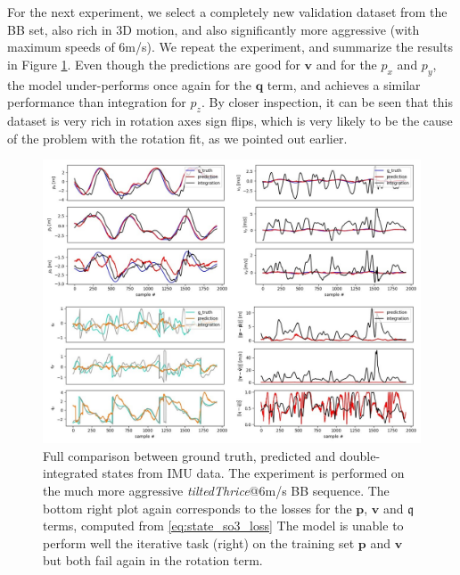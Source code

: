 For the next experiment, we select a completely new validation dataset from the BB set, also rich in 3D motion, and also significantly more aggressive (with maximum speeds of 6m/s). 
We repeat the experiment, and summarize the results in Figure \ref{fig:so3_tiltedThrice_fit}.
Even though the predictions are good for $\mathbf{v}$ and for the $p_x$ and $p_y$, the model under-performs once again for the $\mathbf{q}$ term, and achieves a similar performance than integration for $p_z$. 
By closer inspection, it can be seen that this dataset is very rich in rotation axes sign flips, which is very likely to be the cause of the problem with the rotation fit, as we pointed out earlier. 
\begin{figure}
    \centering
    \includegraphics[width=\textwidth,height=\textheight,keepaspectratio]{thesis_template/img/imu_int_50_so3_tiltedThrice.jpg}
    \caption{Full comparison between ground truth, predicted and double-integrated states from IMU data. 
    The experiment is performed on the much more aggressive \emph{tiltedThrice}@6m/s BB sequence. 
    The bottom right plot again corresponds to the losses for the $\mathbf{p}$, $\mathbf{v}$ and $\mathfrak{q}$ terms, computed from \ref{eq:state_so3_loss}
    The model is unable to perform well the iterative task (right) on the training set
    $\mathbf{p}$ and $\mathbf{v}$ but both fail again in the rotation term.}
    \label{fig:so3_tiltedThrice_fit}
\end{figure}

